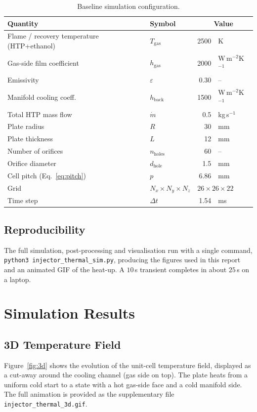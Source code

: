 \documentclass[11pt,a4paper]{article}
\begin{document}
\begin{table}[h]
\centering
\caption{Baseline simulation configuration.}
\label{tab:config}
\begin{tabular}{llr@{ }l}
\toprule
Quantity & Symbol & \multicolumn{2}{c}{Value} \\
\midrule
Flame / recovery temperature (HTP+ethanol) & $T_\mathrm{gas}$ & 2500 & K \\
Gas-side film coefficient & $h_\mathrm{gas}$ & 2000 & W\,m$^{-2}$K$^{-1}$ \\
Emissivity                & $\varepsilon$    & 0.30 & -- \\
Manifold cooling coeff.   & $h_\mathrm{back}$ & 1500 & W\,m$^{-2}$K$^{-1}$ \\
Total HTP mass flow       & $\dot m$         & 0.5  & kg\,s$^{-1}$ \\
Plate radius              & $R$              & 30   & mm \\
Plate thickness           & $L$              & 12   & mm \\
Number of orifices        & $n_\mathrm{holes}$ & 60 & -- \\
Orifice diameter          & $d_\mathrm{hole}$  & 1.5 & mm \\
Cell pitch (Eq.~\ref{eq:pitch}) & $p$        & 6.86 & mm \\
Grid                      & $N_x\!\times\!N_y\!\times\!N_z$ & \multicolumn{2}{l}{$26\times26\times22$} \\
Time step                 & $\Delta t$       & 1.54 & ms \\
\bottomrule
\end{tabular}
\end{table}

\subsection{Reproducibility}
The full simulation, post-processing and visualisation run with a single command,
\texttt{python3 injector\_thermal\_sim.py}, producing the figures used in this
report and an animated GIF of the heat-up. A $10\,$s transient completes in about
$25\,$s on a laptop.

\section{Simulation Results}
\subsection{3D Temperature Field}
Figure~\ref{fig:3d} shows the evolution of the unit-cell temperature field,
displayed as a cut-away around the cooling channel (gas side on top). The plate
heats from a uniform cold start to a state with a hot gas-side face and a cold
manifold side. The full animation is provided as the supplementary file
\texttt{injector\_thermal\_3d.gif}.
\end{document}
